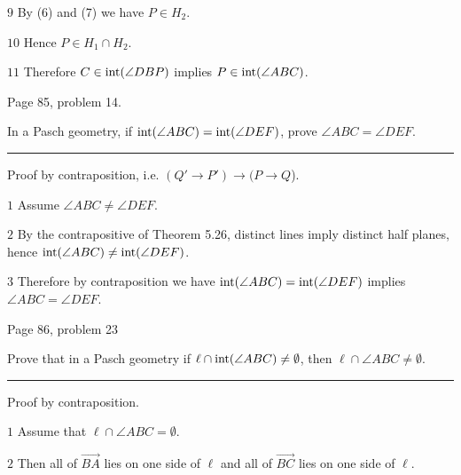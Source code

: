 \medskip
\item{$\scriptstyle9$}
By (6) and (7) we have $P\in H_2$.

\medskip
\item{$\scriptstyle10$}
Hence $P\in H_1\cap H_2$.

\medskip
\item{$\scriptstyle11$}
Therefore $C\in \mathop{\rm int}\nolimits(\angle DBP)$ implies $P\in \mathop{\rm int}\nolimits(\angle ABC)$.

\vfill
\eject

\beginsection Page 85, problem 14.

In a Pasch geometry, if $\mathop{\rm int}\nolimits(\angle ABC)=\mathop{\rm int}\nolimits(\angle DEF)$,
prove $\angle ABC=\angle DEF$.

\medskip
\hrule

\bigskip
\noindent
Proof by contraposition, i.e. $(Q'\rightarrow P')\rightarrow(P\rightarrow Q$).

\medskip
\item{$\scriptstyle1$}
Assume $\angle ABC\ne\angle DEF$.


\medskip
\item{$\scriptstyle2$}
By the contrapositive of Theorem 5.26, distinct lines imply distinct half planes, hence
$\mathop{\rm int}\nolimits(\angle ABC)\ne\mathop{\rm int}\nolimits(\angle DEF)$.

\medskip
\item{$\scriptstyle3$}
Therefore by contraposition we have
$\mathop{\rm int}\nolimits(\angle ABC)=\mathop{\rm int}\nolimits(\angle DEF)$
implies
$\angle ABC=\angle DEF$.

\vfill
\eject

\beginsection Page 86, problem 23

Prove that in a Pasch geometry if $\ell\cap\mathop{\rm int}\nolimits(\angle ABC)\ne\emptyset$,
then $\ell\cap\angle ABC\ne\emptyset$.

\medskip
\hrule

\bigskip
\noindent
Proof by contraposition.

\medskip
\item{$\scriptstyle1$}
Assume that $\ell\cap\angle ABC=\emptyset$.

\medskip
\item{$\scriptstyle2$}
Then all of $\overrightarrow{BA}$ lies on one side of $\ell$ and
all of $\overrightarrow{BC}$ lies on one side of $\ell$.

